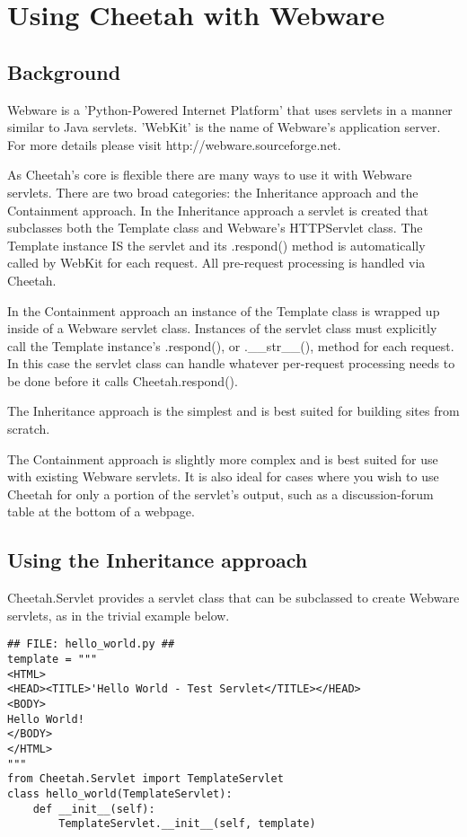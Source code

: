 \section{Using Cheetah with Webware}
\label{webware}

\subsection{Background}
Webware is a 'Python-Powered Internet Platform' that uses servlets in a manner
similar to Java servlets.  'WebKit' is the name of Webware's application server.
For more details please visit http://webware.sourceforge.net.

As Cheetah's core is flexible there are many ways to use it with Webware
servlets.  There are two broad categories: the Inheritance approach and
the Containment approach.  In the Inheritance approach a servlet is created that
subclasses both the Template class and Webware's HTTPServlet class.  The
Template instance IS the servlet and its .respond() method is
automatically called by WebKit for each request.  All pre-request processing is
handled via Cheetah.

In the Containment approach an instance of the Template class is wrapped
up inside of a Webware servlet class.  Instances of the servlet class must
explicitly call the Template instance's .respond(), or .__str__(), method
for each request.  In this case the servlet class can handle whatever
per-request processing needs to be done before it calls Cheetah.respond().

The Inheritance approach is the simplest and is best suited for building sites
from scratch.

The Containment approach is slightly more complex and is best suited for use
with existing Webware servlets.  It is also ideal for cases where you wish to
use Cheetah for only a portion of the servlet's output, such as a
discussion-forum table at the bottom of a webpage. 

\subsection{Using the Inheritance approach}
Cheetah.Servlet provides a servlet class that can be subclassed to create 
Webware servlets, as in the trivial example below.

\begin{verbatim}
## FILE: hello_world.py ##
template = """
<HTML>
<HEAD><TITLE>'Hello World - Test Servlet</TITLE></HEAD>
<BODY>
Hello World!
</BODY>
</HTML>
"""
from Cheetah.Servlet import TemplateServlet
class hello_world(TemplateServlet):
    def __init__(self):
        TemplateServlet.__init__(self, template) 
\end{verbatim}

